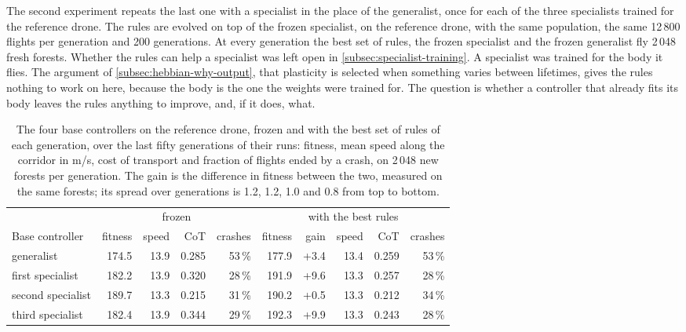 The second experiment repeats the last one with a specialist in the place of the generalist, once for each of the three specialists trained for the reference drone. The rules are evolved on top of the frozen specialist, on the reference drone, with the same population, the same 12\,800 flights per generation and 200 generations. At every generation the best set of rules, the frozen specialist and the frozen generalist fly 2\,048 fresh forests. Whether the rules can help a specialist was left open in \autoref{subsec:specialist-training}. A specialist was trained for the body it flies. The argument of \autoref{subsec:hebbian-why-output}, that plasticity is selected when something varies between lifetimes, gives the rules nothing to work on here, because the body is the one the weights were trained for. The question is whether a controller that already fits its body leaves the rules anything to improve, and, if it does, what.

\begin{table}[htbp]
\centering
\small
\begin{tabularx}{\textwidth}{>{\raggedright\arraybackslash}X r r r r r r r r r}
\hline
 & \multicolumn{4}{c}{frozen} & \multicolumn{5}{c}{with the best rules} \\
Base controller & fitness & speed & CoT & crashes & fitness & gain & speed & CoT & crashes \\
\hline
generalist & 174.5 & 13.9 & 0.285 & 53\,\% & 177.9 & +3.4 & 13.4 & 0.259 & 53\,\% \\
first specialist & 182.2 & 13.9 & 0.320 & 28\,\% & 191.9 & +9.6 & 13.3 & 0.257 & 28\,\% \\
second specialist & 189.7 & 13.3 & 0.215 & 31\,\% & 190.2 & +0.5 & 13.3 & 0.212 & 34\,\% \\
third specialist & 182.4 & 13.9 & 0.344 & 29\,\% & 192.3 & +9.9 & 13.3 & 0.243 & 28\,\% \\
\hline
\end{tabularx}
\caption[The four base controllers on the reference drone, frozen and with the best rules]{The four base controllers on the reference drone, frozen and with the best set of rules of each generation, over the last fifty generations of their runs: fitness, mean speed along the corridor in m/s, cost of transport and fraction of flights ended by a crash, on 2\,048 new forests per generation. The gain is the difference in fitness between the two, measured on the same forests; its spread over generations is 1.2, 1.2, 1.0 and 0.8 from top to bottom.}
\label{tab:inner-loop-bases}
\end{table}


